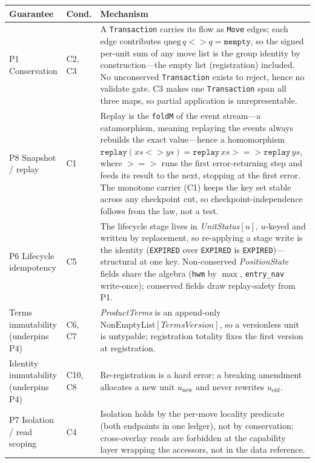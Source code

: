\documentclass[11pt,a4paper]{article}
\begin{document}
\begin{center}
\small
\begin{longtable}{@{}p{3.5cm}p{1.6cm}p{6.4cm}@{}}
\toprule
\textbf{Guarantee} & \textbf{Cond.} & \textbf{Mechanism} \\
\midrule
\endhead
P1 Conservation & C2, C3 & A \texttt{Transaction} carries its flow as \texttt{Move} edges; each edge contributes $\mathrm{qneg}\,q\mathbin{<\!\!>}q=\texttt{mempty}$, so the signed per-unit sum of any move list is the group identity by construction---the empty list (registration) included. No unconserved \texttt{Transaction} exists to reject, hence no validate gate. C3 makes one \texttt{Transaction} span all three maps, so partial application is unrepresentable. \\
P8 Snapshot / replay & C1 & Replay is the \texttt{foldM} of the event stream---a catamorphism, meaning replaying the events always rebuilds the exact value---hence a homomorphism $\texttt{replay}(xs\mathbin{<\!\!>}ys)=\texttt{replay}\,xs \mathrel{>\!\!=\!\!>} \texttt{replay}\,ys$, where $\mathbin{>\!\!=\!\!>}$ runs the first error-returning step and feeds its result to the next, stopping at the first error. The monotone carrier (C1) keeps the key set stable across any checkpoint cut, so checkpoint-independence follows from the law, not a test. \\
P6 Lifecycle idempotency & C5 & The lifecycle stage lives in \emph{UnitStatus}$[u]$, $u$-keyed and written by replacement, so re-applying a stage write is the identity (\texttt{EXPIRED} over \texttt{EXPIRED} is \texttt{EXPIRED})---structural at one key. Non-conserved \emph{PositionState} fields share the algebra (\texttt{hwm} by $\max$, \texttt{entry\_nav} write-once); conserved fields draw replay-safety from P1. \\
Terms immutability (underpins P4) & C6, C7 & \emph{ProductTerms} is an append-only $\mathrm{NonEmptyList}[\mathit{TermsVersion}]$, so a versionless unit is untypable; registration totality fixes the first version at registration. \\
Identity immutability (underpins P4) & C10, C8 & Re-registration is a hard error; a breaking amendment allocates a new unit $u_{\mathrm{new}}$ and never rewrites $u_{\mathrm{old}}$. \\
P7 Isolation / read scoping & C4 & Isolation holds by the per-move locality predicate (both endpoints in one ledger), not by conservation; cross-overlay reads are forbidden at the capability layer wrapping the accessors, not in the data reference. \\

\end{longtable}
\end{center}
\end{document}
